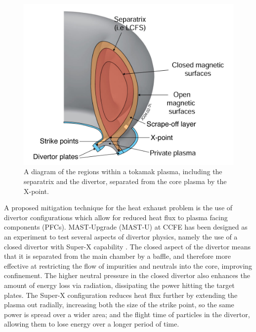 \documentclass[a4paper, 12pt]{article} %
\begin{document}
	\begin{figure}
		\centering
		\vspace{-10pt}
		\includegraphics[width=1.0\linewidth]{IllustrativeFigures/divertor.jpg}
		\caption{\label{fig:divertor}A diagram of the regions within a tokamak plasma, including the separatrix and the divertor, separated from the core plasma by the X-point.}
	\end{figure}
	A proposed mitigation technique for the heat exhaust problem is the use of divertor configurations which allow for reduced heat flux to plasma facing components (PFCs). 
	MAST-Upgrade (MAST-U) at CCFE has been designed as an experiment to test several aspects of divertor physics, namely the use of a closed divertor with Super-X capability \cite{Valanju2009}.
	The closed aspect of the divertor means that it is separated from the main chamber by a baffle, and therefore more effective at restricting the flow of impurities and neutrals into the core, improving confinement. 
	The higher neutral pressure in the closed divertor also enhances the amount of energy loss via radiation, dissipating the power hitting the target plates.
	The Super-X configuration reduces heat flux further by extending the plasma out radially, increasing both the size of the strike point, so the same power is spread over a wider area; and the flight time of particles in the divertor, allowing them to lose energy over a longer period of time.
\end{document}
